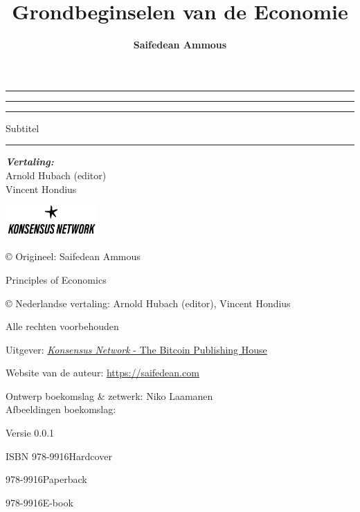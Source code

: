 \documentclass[smalldemyvopaper,10pt,twoside,onecolumn,openright,extrafontsizes]{memoir}
\title{Grondbeginselen van de Economie}
\author{\textbf{Saifedean Ammous}}
\newcommand{\subtitle}{Subtitel}
\newcommand{\ISBNHC}{978-9916}
\newcommand{\ISBNSC}{978-9916}
\newcommand{\ISBNEBOOK}{978-9916}
\newcommand{\editor}{Arnold Hubach (editor)}
\newcommand{\translatorone}{Vincent Hondius}
\newcommand{\translators}{
\textbf{Vertaling:}\\
\editor\\
\translatorone\\

}
\newcommand*\halftitlepage{\begingroup %
  \setlength\drop{0.1\textheight}
  \begin{center}
  \vspace*{\drop}
  \rule{\textwidth}{0in}\par
  {\Large\textsc\thetitle\par}
  \rule{\textwidth}{0in}\par
  \vfill
  \end{center}
\endgroup}
\newlength\drop
\newcommand*\titleM{\begingroup %
  \setlength\drop{0.15\textheight}
  \begin{center}
  \vspace*{\drop}
  \rule{\textwidth}{0in}\par
  {\huge\textsc\thetitle\par}
  {\Large\textsc\subtitle\par}
  \rule{5.5cm}{0.3mm}\par
  {\large\textit\theauthor\par}
  \vspace{2mm}
  {\footnotesize\textit\translators\par}
  \vfill
  \includegraphics[width=3.5cm]{figures/knw.png}\par
  \end{center}
\endgroup}
\begin{document}
\makeatletter
\renewcommand{\@seccntformat}[1]{}
\makeatother


\frontmatter
\pagestyle{empty}
\halftitlepage
\cleardoublepage

\titleM
\clearpage
\vphantom{just for the drop}
\vfill

\begin{scriptsize}
\noindent \copyright{} Origineel: Saifedean Ammous
\par\noindent Principles of Economics

\vspace{0.5\baselineskip}

\noindent \copyright{} Nederlandse vertaling: \editor,
\translatorone
\par\noindent \thetitle

\vspace{0.5\baselineskip}

\noindent Alle rechten voorbehouden

\vspace{0.5\baselineskip}

\noindent Uitgever: \href{https://konsensus.network}{\textit{Konsensus Network} - The Bitcoin Publishing House}

\vspace{0.5\baselineskip}

\noindent Website van de auteur: \url{https://saifedean.com}

\vspace{0.5\baselineskip}

\noindent Ontwerp boekomslag \& zetwerk: Niko Laamanen \\
\noindent Afbeeldingen boekomslag: 

\vspace{0.5\baselineskip}

\noindent Versie 0.0.1

\vspace{0.5\baselineskip}

\setlength{\parindent}{2em}%
\noindent ISBN \ISBNHC \:Hardcover

\hspace{0.28\parindent}\ISBNSC \:Paperback

\hspace{0.28\parindent}\ISBNEBOOK \:E-book
\setlength{\parindent}{0pt}

\end{scriptsize}
\end{document}
